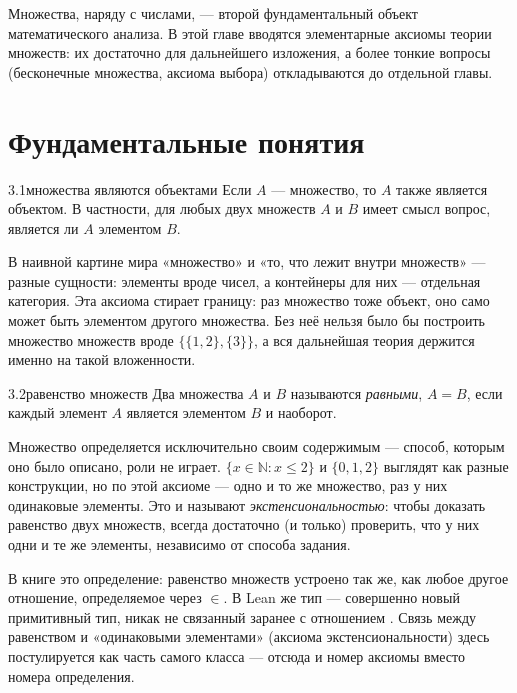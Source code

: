 Множества, наряду с числами, — второй фундаментальный объект математического анализа.
В этой главе вводятся элементарные аксиомы теории множеств: их достаточно для дальнейшего
изложения, а более тонкие вопросы (бесконечные множества, аксиома выбора) откладываются
до отдельной главы.

\section{Фундаментальные понятия}

\begin{axiom}{3.1}{множества являются объектами}
Если $A$ — множество, то $A$ также является объектом. В частности, для любых двух множеств
$A$ и $B$ имеет смысл вопрос, является ли $A$ элементом $B$.
\end{axiom}

\begin{intuition}
В наивной картине мира «множество» и «то, что лежит внутри множеств» — разные сущности:
элементы вроде чисел, а контейнеры для них — отдельная категория. Эта аксиома стирает
границу: раз множество тоже объект, оно само может быть элементом другого множества. Без
неё нельзя было бы построить множество множеств вроде $\{\{1,2\},\{3\}\}$, а вся дальнейшая
теория держится именно на такой вложенности.
\end{intuition}

\begin{axiom}{3.2}{равенство множеств}
Два множества $A$ и $B$ называются \emph{равными}, $A=B$, если каждый элемент $A$
является элементом $B$ и наоборот.
\end{axiom}

\begin{intuition}
Множество определяется исключительно своим содержимым — способ, которым оно было описано,
роли не играет. $\{x \in \mathbb{N} : x \le 2\}$ и $\{0,1,2\}$ выглядят как разные конструкции, но по этой
аксиоме — одно и то же множество, раз у них одинаковые элементы. Это и называют
\emph{экстенсиональностью}: чтобы доказать равенство двух множеств, всегда достаточно (и
только) проверить, что у них одни и те же элементы, независимо от способа задания.
\end{intuition}

\begin{remark}
В книге это определение: равенство множеств устроено так же, как любое другое
отношение, определяемое через $\in$. В Lean же тип  — совершенно новый
примитивный тип, никак не связанный заранее с отношением . Связь между
равенством и «одинаковыми элементами» (аксиома экстенсиональности) здесь постулируется
как часть самого класса  — отсюда и номер аксиомы вместо номера
определения.
\end{remark}

